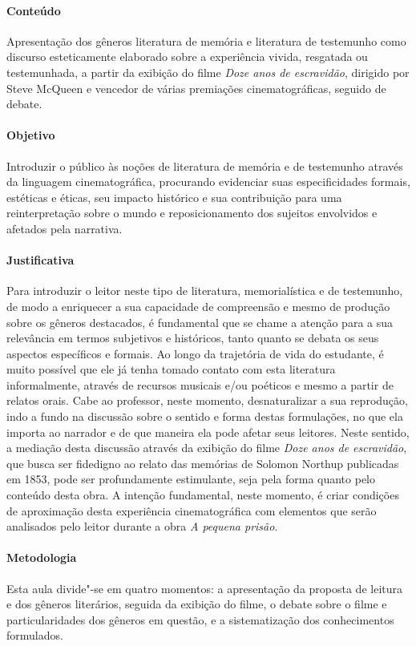 \documentclass[11pt]{extarticle}
\begin{document}
\paragraph{Conteúdo} Apresentação dos gêneros literatura de memória e
literatura de testemunho como discurso esteticamente elaborado sobre a
experiência vivida, resgatada ou testemunhada, a partir da exibição do
filme \emph{Doze anos de escravidão}, dirigido por Steve McQueen e vencedor
de várias premiações cinematográficas, seguido de debate.

\paragraph{Objetivo} Introduzir o público às noções de literatura de
memória e de testemunho através da linguagem cinematográfica, procurando
evidenciar suas especificidades formais, estéticas e éticas, seu impacto
histórico e sua contribuição para uma reinterpretação sobre o mundo e
reposicionamento dos sujeitos envolvidos e afetados pela narrativa.

\paragraph{Justificativa} Para introduzir o leitor neste tipo de
literatura, memorialística e de testemunho, de modo a enriquecer a sua
capacidade de compreensão e mesmo de produção sobre os gêneros
destacados, é fundamental que se chame a atenção para a sua relevância
em termos subjetivos e históricos, tanto quanto se debata os seus
aspectos específicos e formais. Ao longo da trajetória de vida do
estudante, é muito possível que ele já tenha tomado contato com esta
literatura informalmente, através de recursos musicais e/ou poéticos e
mesmo a partir de relatos orais. Cabe ao professor, neste momento,
desnaturalizar a sua reprodução, indo a fundo na discussão sobre o
sentido e forma destas formulações, no que ela importa ao narrador e de
que maneira ela pode afetar seus leitores. Neste sentido, a mediação
desta discussão através da exibição do filme \emph{Doze anos de escravidão},
que busca ser fidedigno ao relato das
memórias de Solomon Northup publicadas em 1853, pode ser profundamente
estimulante, seja pela forma quanto pelo conteúdo desta obra. A intenção
fundamental, neste momento, é criar condições de aproximação desta
experiência cinematográfica com elementos que serão analisados pelo
leitor durante a obra \emph{A pequena prisão}.

\paragraph{Metodologia} Esta aula divide"-se em quatro momentos: a
apresentação da proposta de leitura e dos gêneros literários, seguida da
exibição do filme, o debate sobre o filme e particularidades dos
gêneros em questão, e a sistematização dos conhecimentos formulados.
\end{document}
